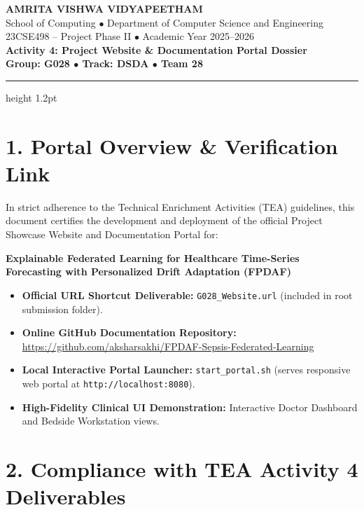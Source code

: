 \documentclass[11pt, a4paper]{article}
\begin{document}
\noindent
\begin{minipage}{\textwidth}
\centering
{\Large \textbf{\textcolor{amritaMaroon}{AMRITA VISHWA VIDYAPEETHAM}}}\\
{\small School of Computing $\bullet$ Department of Computer Science and Engineering}\\
{\small 23CSE498 -- Project Phase II $\bullet$ Academic Year 2025--2026}\\
\vspace{0.3cm}
{\LARGE \textbf{Activity 4: Project Website \& Documentation Portal Dossier}}\\
\vspace{0.2cm}
\textbf{\textcolor{slateNavy}{Group: G028 $\bullet$ Track: DSDA $\bullet$ Team 28}}
\end{minipage}

\vspace{0.4cm}
\hrule height 1.2pt
\vspace{0.4cm}

\section*{1. Portal Overview \& Verification Link}
In strict adherence to the Technical Enrichment Activities (TEA) guidelines, this document certifies the development and deployment of the official Project Showcase Website and Documentation Portal for:

\begin{center}
\textbf{Explainable Federated Learning for Healthcare Time-Series Forecasting with Personalized Drift Adaptation (FPDAF)}
\end{center}

\begin{itemize}
    \item \textbf{Official URL Shortcut Deliverable:} \texttt{G028\_Website.url} (included in root submission folder).
    \item \textbf{Online GitHub Documentation Repository:} \url{https://github.com/aksharsakhi/FPDAF-Sepsis-Federated-Learning}
    \item \textbf{Local Interactive Portal Launcher:} \texttt{start\_portal.sh} (serves responsive web portal at \texttt{http://localhost:8080}).
    \item \textbf{High-Fidelity Clinical UI Demonstration:} Interactive Doctor Dashboard and Bedside Workstation views.
\end{itemize}

\section*{2. Compliance with TEA Activity 4 Deliverables}
\end{document}
